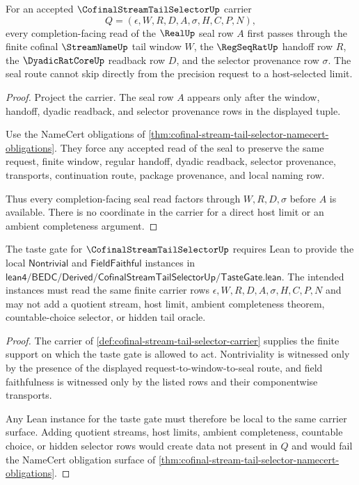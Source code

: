 \begin{theorem}
\label{thm:cofinal-stream-tail-selector-seal-order}
For an accepted $\CofinalStreamTailSelectorUp$ carrier
$$
Q=(\epsilon,W,R,D,A,\sigma,H,C,P,N),
$$
every completion-facing read of the $\RealUp$ seal row $A$ first passes through the finite cofinal $\StreamNameUp$ tail window $W$, the $\RegSeqRatUp$ handoff row $R$, the $\DyadicRatCoreUp$ readback row $D$, and the selector provenance row $\sigma$. The seal route cannot skip directly from the precision request to a host-selected limit.
\end{theorem}
\begin{proof}
Project the carrier. The seal row $A$ appears only after the window, handoff, dyadic readback, and selector provenance rows in the displayed tuple.

Use the NameCert obligations of \autoref{thm:cofinal-stream-tail-selector-namecert-obligations}. They force any accepted read of the seal to preserve the same request, finite window, regular handoff, dyadic readback, selector provenance, transports, continuation route, package provenance, and local naming row.

Thus every completion-facing seal read factors through $W,R,D,\sigma$ before $A$ is available. There is no coordinate in the carrier for a direct host limit or an ambient completeness argument.
\end{proof}

\begin{theorem}
\label{thm:cofinal-stream-tail-selector-tastegate-obligation}
The taste gate for $\CofinalStreamTailSelectorUp$ requires Lean to provide the local $\mathsf{Nontrivial}$ and $\mathsf{FieldFaithful}$ instances in $\mathsf{lean4/BEDC/Derived/CofinalStreamTailSelectorUp/TasteGate.lean}$. The intended instances must read the same finite carrier rows $\epsilon,W,R,D,A,\sigma,H,C,P,N$ and may not add a quotient stream, host limit, ambient completeness theorem, countable-choice selector, or hidden tail oracle.
\end{theorem}
\begin{proof}
The carrier of \autoref{def:cofinal-stream-tail-selector-carrier} supplies the finite support on which the taste gate is allowed to act. Nontriviality is witnessed only by the presence of the displayed request-to-window-to-seal route, and field faithfulness is witnessed only by the listed rows and their componentwise transports.

Any Lean instance for the taste gate must therefore be local to the same carrier surface. Adding quotient streams, host limits, ambient completeness, countable choice, or hidden selector rows would create data not present in $Q$ and would fail the NameCert obligation surface of \autoref{thm:cofinal-stream-tail-selector-namecert-obligations}.
\end{proof}

